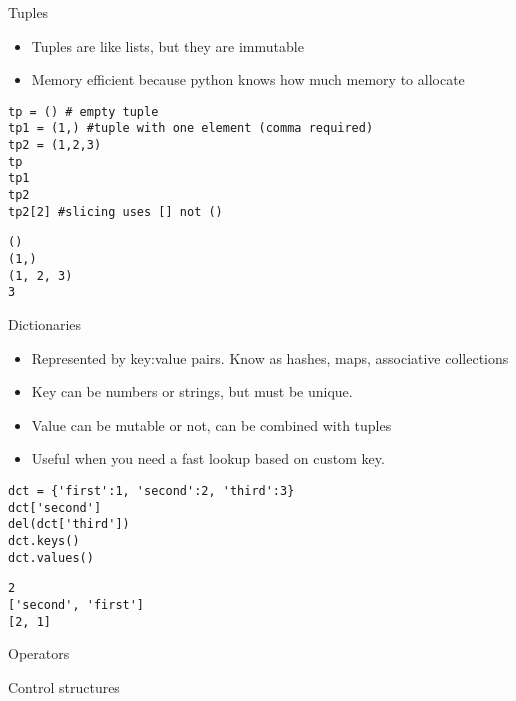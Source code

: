 \documentclass[presentation]{beamer}
\begin{document}
\begin{frame}[fragile,label=sec-4-1-12]{Tuples}
 \begin{itemize}
\item Tuples are like lists, but they are immutable
\item Memory efficient because python knows how much memory to allocate
\end{itemize}
\lstset{numbers=left,language=Python,label= ,caption= }
\begin{lstlisting}
tp = () # empty tuple
tp1 = (1,) #tuple with one element (comma required)
tp2 = (1,2,3)
tp
tp1
tp2
tp2[2] #slicing uses [] not ()
\end{lstlisting}

\lstset{numbers=left,language=Python,label= ,caption= }
\begin{lstlisting}
()
(1,)
(1, 2, 3)
3
\end{lstlisting}
\end{frame}


\begin{frame}[fragile,label=sec-4-1-13]{Dictionaries}
 \begin{itemize}
\item Represented by key:value pairs. Know as hashes, maps, associative collections
\item Key can be numbers or strings, but must be unique.
\item Value can be mutable or not, can be combined with tuples
\item Useful when you need a fast lookup based on custom key.
\end{itemize}

\lstset{numbers=left,language=Python,label= ,caption= }
\begin{lstlisting}
dct = {'first':1, 'second':2, 'third':3}
dct['second']
del(dct['third'])
dct.keys()
dct.values()
\end{lstlisting}

\lstset{numbers=left,language=Python,label= ,caption= }
\begin{lstlisting}
2
['second', 'first']
[2, 1]
\end{lstlisting}
\end{frame}


\begin{frame}[label=sec-4-1-14]{Operators}
\end{frame}


\begin{frame}[label=sec-4-1-15]{Control structures}
\end{frame}
\end{document}
